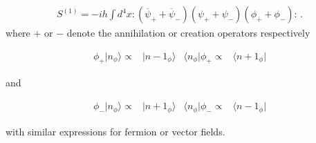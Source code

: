 \begin{align}
  S^{(1)}=-i h \int d^4x:(\overline{\psi}_++\overline{\psi}_-)(\psi_++\psi_-)(\phi_++\phi_-):\,.
\end{align}
where $+$ or $-$ denote the annihilation or creation operators respectively

\begin{align}
 \phi_{+} | n_{\phi} \rangle  \propto& |n-1_{\phi}\rangle & \langle n_{\phi}|\phi_{+} \propto& \langle n+1_{\phi}|
\end{align}

and

\begin{align}
 \phi_{-} |n_{\phi}\rangle  \propto& |n+1_{\phi}\rangle&  \langle n_{\phi}| \phi_{-} \propto& \langle n-1_{\phi}|
\end{align}

with similar expressions for fermion or vector fields.



